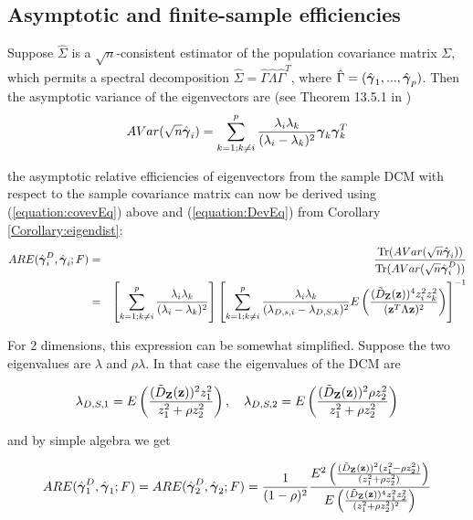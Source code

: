 \documentclass[fleqn,11pt]{article}
\DeclareMathOperator*{\Tr}{Tr}
\begin{document}
\subsection{Asymptotic and finite-sample efficiencies}
Suppose $\hat\Sigma$ is a $\sqrt n$-consistent estimator of the population covariance matrix $\Sigma$, which permits a spectral decomposition $ \hat\Sigma = \hat\Gamma \hat\Lambda \hat\Gamma^T $, where $\hat\Gamma = (\hat{{\boldsymbol{\gamma}}}_1,...,\hat{{\boldsymbol{\gamma}}}_p)$. Then the asymptotic variance of the eigenvectors are (see Theorem 13.5.1 in \cite{anderson})
\begin{equation} \label{equation:covevEq}
AVar(\sqrt n\hat {{\boldsymbol{\gamma}}}_i) = \sum_{k=1; k \neq i}^p \frac{\lambda_i \lambda_k}{(\lambda_i - \lambda_k)^2} {\boldsymbol{\gamma}}_k {\boldsymbol{\gamma}}_k^T
\end{equation}

the asymptotic relative efficiencies of eigenvectors from the sample DCM with respect to the sample covariance matrix can now be derived using (\ref{equation:covevEq}) above and (\ref{equation:DevEq}) from Corollary \ref{Corollary:eigendist}:
\begin{eqnarray*}
ARE(\hat\bfgamma^D_i, \hat\bfgamma_i; F) &=& \frac{\Tr( AVar(\sqrt n\hat \bfgamma_i))}{\Tr( AVar(\sqrt n\hat \bfgamma^D_i))}\\
&=& \left[\sum_{k=1; k \neq i}^p \frac{\lambda_i \lambda_k}{(\lambda_i - \lambda_k)^2} \right] \left[ \sum_{k=1; k \neq i}^p \frac{\lambda_i \lambda_k }{(\lambda_{D,s,i} - \lambda_{D,S,k})^2} E \left( \frac{(\tilde D_\bfZ (\bfz))^4 z_i^2 z_k^2}{(\bfz^T \Lambda \bfz)^2} \right) \right]^{-1}
\end{eqnarray*}

For 2 dimensions, this expression can be somewhat simplified. Suppose the two eigenvalues are $\lambda$ and $\rho\lambda$. In that case the eigenvalues of the DCM are

$$ \lambda_{D,S,1} = E \left( \frac{(\tilde D_{\mathbf{Z}}({\bf{z}}))^2 z_1^2}{z_1^2 + \rho z_2^2} \right), \quad
\lambda_{D,S,2} = E \left( \frac{(\tilde D_{\mathbf{Z}}({\bf{z}}))^2 \rho z_2^2}{z_1^2 + \rho z_2^2} \right) $$

and by simple algebra we get

$$ ARE(\hat{{\boldsymbol{\gamma}}}^D_1, \hat{{\boldsymbol{\gamma}}}_1; F) = ARE(\hat{{\boldsymbol{\gamma}}}^D_2, \hat{{\boldsymbol{\gamma}}}_2; F) = \frac{1}{(1-\rho)^2} \frac{E^2 \left( \frac{(\tilde D_{\mathbf{Z}}({\bf{z}}))^2 (z_1^2 - \rho z_2^2)}{(z_1^2 + \rho z_2^2)} \right)}{E \left( \frac{(\tilde D_{\mathbf{Z}}({\bf{z}}))^4 z_1^2z_2^2}{(z_1^2 + \rho z_2^2)^2}\right)} $$
\end{document}
